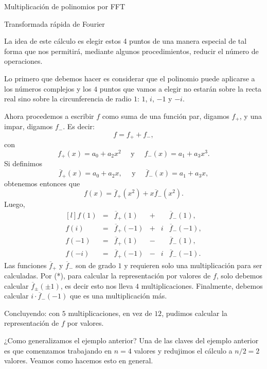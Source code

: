 \begin{chapter}{Multiplicación de polinomios por FFT}
\begin{section}{Transformada rápida de Fourier}
\begin{ejemplo*}
        La idea de este cálculo es elegir estos 4 puntos de una manera especial de tal forma que nos permitirá,  mediante algunos procedimientos, reducir el número de operaciones. 

        Lo primero que debemos hacer es considerar que el polinomio puede aplicarse a los números complejos y  los $4$ puntos que vamos a elegir no estarán sobre la recta real sino sobre la circunferencia de radio  $1$: $1$, $i$, $-1$ y $-i$. 
        
        Ahora procedemos a escribir  $f $ como suma de una función par, digamos $f_+$, y una impar, digamos $f_-$. Es decir:
        $$
        f = f_+ + f_-,$$
        con 
        $$ f_+(x) = a_0 + a_2x^2 \quad  \text{ y } \quad f_-(x) = a_1 + a_3x^3.
        $$
        Si definimos 
        $$
        \overline{f}_+(x) = a_0 + a_2 x, \quad \text{ y } \quad \overline{f}_-(x) = a_1 + a_3 x,
        $$
        obtenemos entonces que 
        \begin{equation*}
            f(x) = \overline{f}_+(x^2) + x \overline{f}_-(x^2).
        \end{equation*}
        Luego,
        \begin{equation}
            \begin{matrix*}[l]
                f(1) &=& \overline{f}_+(1)& + & &\overline{f}_-(1), \\
                f(i) &=& \overline{f}_+(-1)& +&  i&\overline{f}_-(-1), \\
                f(-1) &=& \overline{f}_+(1)& -&  &\overline{f}_-(1), \\
                f(-i) &=& \overline{f}_+(-1) &-&i & \overline{f}_-(-1).
            \end{matrix*} \tag{*}
        \end{equation}
        Las funciones $\overline{f}_+$ y $\overline{f}_-$ son de grado $1$ y requieren solo una multiplicación para ser calculadas. Por (*), para calcular la representación por valores de $f$, solo debemos calcular $\overline{f}_\pm(\pm1)$,  es decir esto nos lleva $4$ multiplicaciones. Finalmente,  debemos  calcular $ i \cdot \overline{f}_-(-1)$  que es una multiplicación más. 

        Concluyendo: con $5$ multiplicaciones,  en vez de $12$, pudimos calcular la representación de $f$ por valores.
    \end{ejemplo*}

    ¿Como generalizamos el ejemplo anterior? Una de las claves del ejemplo anterior es que comenzamos trabajando en $n=4$ valores y redujimos  el cálculo a $n/2=2$ valores. Veamos como hacemos esto en general.   


\end{section}
\end{chapter}
